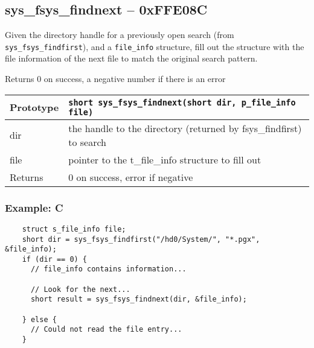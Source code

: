 \subsection*{sys\_fsys\_findnext -- 0xFFE08C}
Given the directory handle for a previously open search (from \verb+sys_fsys_findfirst+), and a \verb+file_info+ structure, fill out the structure with the file information of the next file to match the original search pattern.

Returns 0 on success, a negative number if there is an error

\bigskip

\begin{tabular}{|l||l|} \hline
Prototype & \lstinline!short sys_fsys_findnext(short dir, p_file_info file)! \\ \hline
dir & the handle to the directory (returned by fsys\_findfirst) to search \\ \hline
file & pointer to the t\_file\_info structure to fill out \\ \hline
Returns & 0 on success, error if negative \\ \hline
\end{tabular}

\subsubsection*{Example: C}
\begin{lstlisting}
    struct s_file_info file;
    short dir = sys_fsys_findfirst("/hd0/System/", "*.pgx", &file_info);
    if (dir == 0) {
      // file_info contains information...

      // Look for the next...
      short result = sys_fsys_findnext(dir, &file_info);

    } else {
      // Could not read the file entry...
    }
\end{lstlisting}


